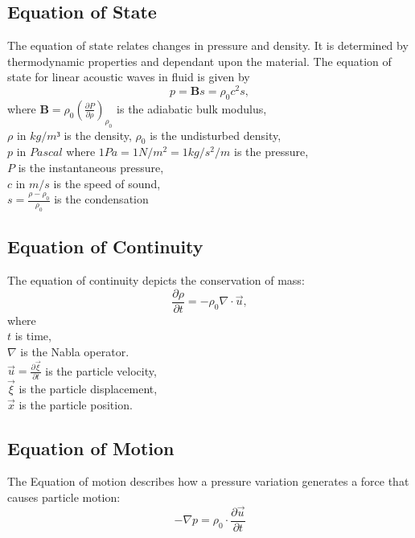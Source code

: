 \subsection{Equation of State}
The equation of state relates changes in pressure and density. It is determined by thermodynamic properties and dependant upon the material. The equation of state for linear acoustic waves in fluid is  given by\cite{Acoustic}
\begin{equation}
    p = \mathbf{B}s = \rho_0c^2s,
\end{equation}
where 
$\mathbf{B}=\rho_0(\frac{\partial P}{\partial \rho})_{\rho_0}$ is the adiabatic bulk modulus,\\
$\rho$ in $kg/m³$ is the density,
$\rho_0$ is the undisturbed density,\\
$p$ in $Pascal$ where $1Pa = 1 N/m^2 = 1kg/s^2/m$ is the pressure,\\
$P$ is the instantaneous pressure,\\
$c$ in $m/s$ is the speed of sound,\\
$s = \frac{\rho-\rho_0}{\rho_0}$ is the condensation 
\subsection{Equation of Continuity}
The equation of continuity depicts the conservation of mass:
\begin{equation}
    \frac{\partial\rho}{\partial t} = -\rho_0\nabla\cdot\Vec{u},
\end{equation}
where\\
$t$ is time,\\
$\nabla$ is the Nabla operator.\\
$\Vec{u} = \frac{\partial\Vec{\xi}}{\partial t}$ is the particle velocity,\\
$\Vec{\xi}$ is the particle displacement,\\
$\Vec{x}$ is the particle position.
\subsection{Equation of Motion}
The Equation of motion describes how a pressure variation generates a force that causes particle motion:
\begin{equation}
    -\nabla p = \rho_0 \cdot \frac{\partial\Vec{u}}{\partial t}
\end{equation}
